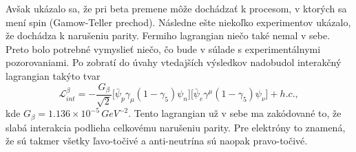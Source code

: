 \documentclass[../../main.tex]{subfiles}
\begin{document}
Avšak ukázalo sa, že pri beta premene môže dochádzať k procesom, v ktorých sa mení spin (Gamow-Teller prechod). Následne ešte niekoľko experimentov ukázalo, že dochádza k narušeniu parity. Fermiho lagrangian niečo také nemal v sebe. Preto bolo potrebné vymyslieť niečo, čo bude v súlade s experimentálnymi pozorovaniami. Po zobratí do úvahy vtedajších výsledkov nadobudol interakčný lagrangian takýto tvar
\begin{equation}
\mathcal{L}^{\beta}_{int}=-\frac{G_{\beta}}{\sqrt{2}}\big[ \bar{\psi}_p\gamma_{\mu}(1-\gamma_5)\psi_n \big] \big[ \bar{\psi}_e\gamma^{\mu}(1-\gamma_5)\psi_{\nu} \big]+h.c.,
\end{equation}
kde $G_{\beta}=1.136 \times 10^{-5}\,GeV^{-2}$. Tento lagrangian už v sebe ma zakódované to, že slabá interakcia podlieha celkovému narušeniu parity. Pre elektróny to znamená, že sú takmer všetky ľavo-točivé a anti-neutrína sú naopak pravo-točivé.
\end{document}
